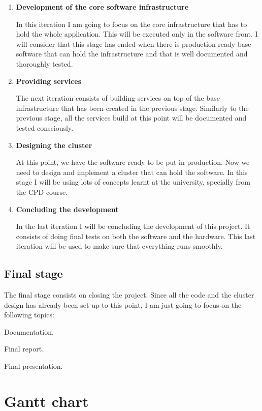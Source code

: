 \begin{enumerate}
 \item {\bf Development of the core software infrastructure}

 In this iteration I am going to focus on the core infrastructure that has to
hold the whole application. This will be executed only in the software front.
I will consider that this stage has ended when there is production-ready base
software that can hold the infrastructure and that is well documented and
thoroughly tested.

 \item {\bf Providing services}

 The next iteration consists of building services on top of the base
infrastructure that has been created in the previous stage. Similarly to the
previous stage, all the services build at this point will be documented and
tested consciously.

  \item {\bf Designing the cluster}

  At this point, we have the software ready to be put in production. Now we
need to design and implement a cluster that can hold the software. In this
stage I will be using lots of concepts learnt at the university, specially from
the CPD course.

  \item {\bf Concluding the development}

  In the last iteration I will be concluding the development of this project.
It consists of doing final tests on both the software and the hardware. This
last iteration will be used to make sure that everything runs smoothly.
\end{enumerate}


\subsection{Final stage}

The final stage consists on closing the project. Since all the code and the
cluster design has already been set up to this point, I am just going to focus
on the following topics:

\mylist
  \item Documentation.
  \item Final report.
  \item Final presentation.
\mylistend

\section*{Gantt chart}

